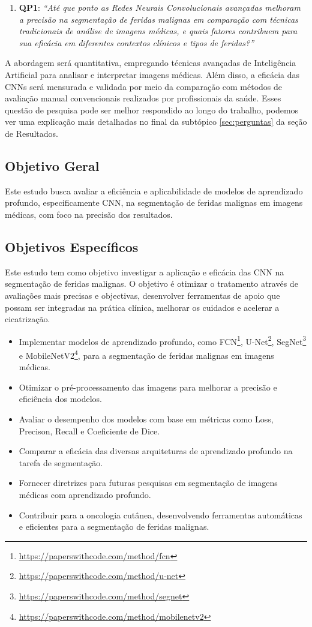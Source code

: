 \begin{enumerate}
  \item \textbf{QP1}: \textit{“Até que ponto as Redes Neurais Convolucionais avançadas melhoram a precisão na segmentação de feridas malignas em comparação com técnicas tradicionais de análise de imagens médicas, e quais fatores contribuem para sua eficácia em diferentes contextos clínicos e tipos de feridas?”}
\end{enumerate}

A abordagem será quantitativa, empregando técnicas avançadas de Inteligência Artificial para analisar e interpretar imagens médicas. Além disso, a eficácia das \ac{CNN}s será mensurada e validada por meio da comparação com métodos de avaliação manual convencionais realizados por profissionais da saúde. Esses questão de pesquisa pode ser melhor respondido ao longo do trabalho, podemos ver uma explicação mais detalhadas no final da subtópico \ref{sec:perguntas} da seção de Resultados.


\subsection{Objetivo Geral}
Este estudo busca avaliar a eficiência e aplicabilidade de modelos de aprendizado profundo, especificamente \ac{CNN}, na segmentação de feridas malignas em imagens médicas, com foco na precisão dos resultados.

\subsection{Objetivos Específicos}
Este estudo tem como objetivo investigar a aplicação e eficácia das \ac{CNN} na segmentação de feridas malignas. O objetivo é otimizar o tratamento através de avaliações mais precisas e objectivas, desenvolver ferramentas de apoio que possam ser integradas na prática clínica, melhorar os cuidados e acelerar a cicatrização.

\begin{itemize}
  \item Implementar modelos de aprendizado profundo, como \ac{FCN}\footnote{\url{https://paperswithcode.com/method/fcn}}, \ac{U-Net}\footnote{\url{https://paperswithcode.com/method/u-net}}, \ac{SegNet}\footnote{\url{https://paperswithcode.com/method/segnet}} e \ac{MobileNetV2}\footnote{\url{https://paperswithcode.com/method/mobilenetv2}}, para a segmentação de feridas malignas em imagens médicas.
  \item Otimizar o pré-processamento das imagens para melhorar a precisão e eficiência dos modelos.
  \item Avaliar o desempenho dos modelos com base em métricas como Loss, Precison, Recall e Coeficiente de Dice.
  \item Comparar a eficácia das diversas arquiteturas de aprendizado profundo na tarefa de segmentação.
  \item Fornecer diretrizes para futuras pesquisas em segmentação de imagens médicas com aprendizado profundo.
  \item Contribuir para a oncologia cutânea, desenvolvendo ferramentas automáticas e eficientes para a segmentação de feridas malignas.
\end{itemize}

